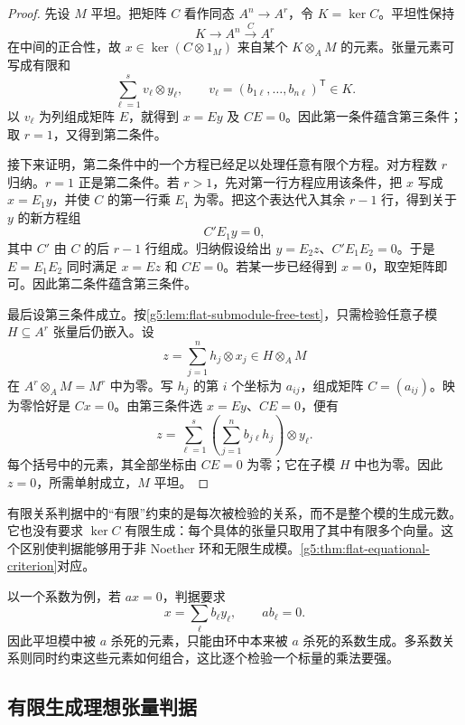 \begin{proof}
	先设 \(M\) 平坦。把矩阵 \(C\) 看作同态 \(A^n\to A^r\)，令 \(K=\ker C\)。平坦性保持
	\[
		K\longrightarrow A^n\xrightarrow{C}A^r
	\]
	在中间的正合性，故 \(x\in\ker(C\otimes1_M)\) 来自某个 \(K\otimes_A M\) 的元素。张量元素可写成有限和
	\[
		\sum_{\ell=1}^s v_\ell\otimes y_\ell,\qquad
		v_\ell=(b_{1\ell},\ldots,b_{n\ell})^{\mathsf T}\in K.
	\]
	以 \(v_\ell\) 为列组成矩阵 \(E\)，就得到 \(x=Ey\) 及 \(CE=0\)。因此第一条件蕴含第三条件；取 \(r=1\)，又得到第二条件。

	接下来证明，第二条件中的一个方程已经足以处理任意有限个方程。对方程数 \(r\) 归纳。\(r=1\) 正是第二条件。若 \(r>1\)，先对第一行方程应用该条件，把 \(x\) 写成 \(x=E_1y\)，并使 \(C\) 的第一行乘 \(E_1\) 为零。把这个表达代入其余 \(r-1\) 行，得到关于 \(y\) 的新方程组
	\[
		C' E_1y=0,
	\]
	其中 \(C'\) 由 \(C\) 的后 \(r-1\) 行组成。归纳假设给出 \(y=E_2z\)、\(C'E_1E_2=0\)。于是 \(E=E_1E_2\) 同时满足 \(x=Ez\) 和 \(CE=0\)。若某一步已经得到 \(x=0\)，取空矩阵即可。因此第二条件蕴含第三条件。

	最后设第三条件成立。按\cref{g5:lem:flat-submodule-free-test}，只需检验任意子模 \(H\subseteq A^r\) 张量后仍嵌入。设
	\[
		z=\sum_{j=1}^n h_j\otimes x_j\in H\otimes_A M
	\]
	在 \(A^r\otimes_A M=M^r\) 中为零。写 \(h_j\) 的第 \(i\) 个坐标为 \(a_{ij}\)，组成矩阵 \(C=(a_{ij})\)。映为零恰好是 \(Cx=0\)。由第三条件选 \(x=Ey\)、\(CE=0\)，便有
	\[
		z=\sum_{\ell=1}^s
		\left(\sum_{j=1}^n b_{j\ell}h_j\right)\otimes y_\ell.
	\]
	每个括号中的元素，其全部坐标由 \(CE=0\) 为零；它在子模 \(H\) 中也为零。因此 \(z=0\)，所需单射成立，\(M\) 平坦。
\end{proof}

有限关系判据中的“有限”约束的是每次被检验的关系，而不是整个模的生成元数。它也没有要求 \(\ker C\) 有限生成：每个具体的张量只取用了其中有限多个向量。这个区别使判据能够用于非 Noether 环和无限生成模。\cref{g5:thm:flat-equational-criterion}对应\cite[第7节，定理7.6，第49--50页]{Matsumura1989}。

\ProseParagraphBreak

以一个系数为例，若 \(ax=0\)，判据要求
\[
	x=\sum_\ell b_\ell y_\ell,\qquad ab_\ell=0.
\]
因此平坦模中被 \(a\) 杀死的元素，只能由环中本来被 \(a\) 杀死的系数生成。多系数关系则同时约束这些元素如何组合，这比逐个检验一个标量的乘法要强。

\subsection{有限生成理想张量判据}
\label{g5:subsec:0601:03}

